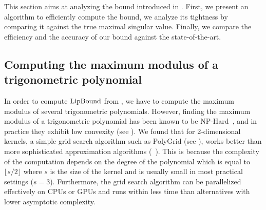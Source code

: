 This section aims at analyzing the bound introduced in .
First, we present an algorithm to efficiently compute the bound, we analyze its tightness by comparing it against the true maximal singular value.
Finally, we compare the efficiency and the accuracy of our bound against the state-of-the-art. 

\subsection{Computing the maximum modulus of a trigonometric polynomial}
\label{subsection:ch5-computing_the_maximum_modulus_of_a_trigonometric_polynomial}

In order to compute $\mathrm{LipBound}$ from , we have to compute the maximum modulus of several trigonometric polynomials.
However, finding the maximum modulus of a trigonometric polynomial has been known to be NP-Hard~\cite{pfister2018bounding}, and in practice they exhibit low convexity (see ).
We found that for 2-dimensional kernels, a simple grid search algorithm such as PolyGrid (see ), works better than more sophisticated approximation algorithms (\eg ~\citet{green1999calculating,de2009finding}).
This is because the complexity of the computation depends on the degree of the polynomial which is equal to $\lfloor s / 2 \rfloor$ where $s$ is the size of the kernel and is usually small in most practical settings (\eg $s=3$).
Furthermore, the grid search algorithm can be parallelized effectively on CPUs or GPUs and runs within less time than alternatives with lower asymptotic complexity. 



